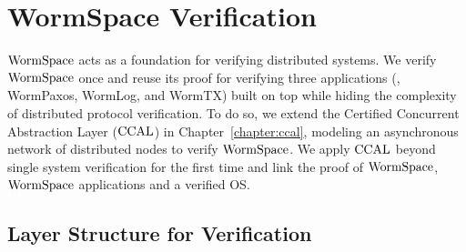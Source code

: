 \section{WormSpace Verification}
\label{sec:formal_verification}


$\mathrm{WormSpace}$ acts as a foundation for verifying distributed systems. 
We verify $\mathrm{WormSpace}$ once and reuse its proof for verifying three applications (\ie, WormPaxos, WormLog, and WormTX)
built on top while hiding the complexity of distributed protocol verification.     
To do so, we extend the Certified Concurrent Abstraction Layer ($\mathrm{CCAL}$)  in Chapter~\ref{chapter:ccal}, 
modeling an asynchronous network of distributed nodes to verify $\mathrm{WormSpace}$. 
We apply $\mathrm{CCAL}$ beyond single system verification for the first time and link the proof of $\mathrm{WormSpace}$, 
$\mathrm{WormSpace}$ applications and a verified OS. 

\subsection{Layer Structure for Verification}

